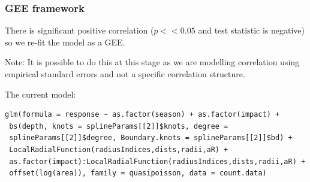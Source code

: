 \begin{frame}[fragile]
\frametitle{GEE framework}
There is significant positive correlation ($p<<0.05$ and test statistic is negative) so we re-fit the model as a GEE.

\bigskip
Note: It is possible to do this at this stage as we are modelling correlation using empirical standard errors and not a specific correlation structure.

\bigskip
\noindent The current model:
\footnotesize
\begin{verbatim}
glm(formula = response ~ as.factor(season) + as.factor(impact) + 
 bs(depth, knots = splineParams[[2]]$knots, degree = 
 splineParams[[2]]$degree, Boundary.knots = splineParams[[2]]$bd) + 
 LocalRadialFunction(radiusIndices,dists,radii,aR) + 
 as.factor(impact):LocalRadialFunction(radiusIndices,dists,radii,aR) +
 offset(log(area)), family = quasipoisson, data = count.data)
\end{verbatim}
\normalsize
\end{frame}

